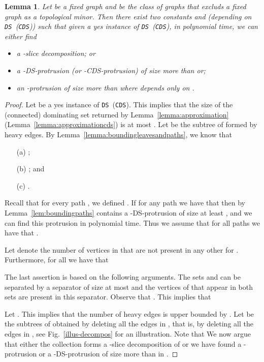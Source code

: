 \documentclass[11pt]{article}
\newtheorem{lemma}{Lemma}
\newcommand{\tDS}{{\texttt{\sc DS}}}
\newcommand{\tCDS}{{\texttt{\sc CDS}}}
\begin{document}
\begin{lemma}
\label{lem:slicedeco}
Let  be a fixed graph and  be the class of graphs that excluds a fixed graph  as a topological minor.  
Then there exist two constants  and  (depending on \tDS \, (\tCDS)) 
such that given a yes instance  of \tDS \, (\tCDS), in polynomial time,  we can either find 
\begin{itemize}
\item a -slice decomposition; or 
\item a -{\sc DS}-protrusion (or -{\sc CDS}-protrusion) of size more than  or;
\item an -protrusion of size more than  where  depends only on .
\end{itemize}
\end{lemma}
\begin{proof}
Let  be a yes instance of \tDS\  (\tCDS). This implies that the size of the (connected) dominating set  returned by Lemma~\ref{lemma:approximation} (Lemma~\ref{lemma:approximationcds}) is at most . 
Let  be the subtree of  formed by  heavy edges. By Lemma~\ref{lemma:boundingleavesandpaths}, we know that 
\begin{itemize}
\item[(a)] ; 
\item[(b)] ; and
\item[(c)] .  
 \end{itemize}
 Recall that for every path  , we defined . If for any path  we have that  then by Lemma~\ref{lem:boundingpaths}   contains a -{\sc DS}-protrusion of size at least , and we can find this protrusion in polynomial time. Thus we assume that for all paths  we have that . 

Let  denote the number of vertices in  that are not present in any other 
 for . Furthermore, for all  we have that 

The last assertion is based on the following arguments. The sets  and   can be separated by a separator of size at most  and the vertices of  that appear in  both sets are present in this separator. 
Observe that . 
This implies that 

Let . 
This implies that the number of heavy edges is upper bounded by . Let  be the subtrees of  obtained by deleting all the edges in , that is, by deleting all the edges in ,  see Fig.~\ref{illus-decompos} for an illustration. Note that   We now argue that either the collection  forms a -slice decomposition of  or we have found a -protrusion or a -{\sc DS}-protrusion of size more than  in . 



\end{proof}
\end{document}
